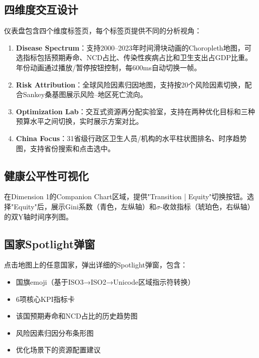 \documentclass[12pt,a4paper]{ctexart}
\begin{document}
\subsection{四维度交互设计}

仪表盘包含四个维度标签页，每个标签页提供不同的分析视角：

\begin{enumerate}[label=\textbf{D\arabic*.}]
    \item \textbf{Disease Spectrum}：支持2000--2023年时间滑块动画的Choropleth地图，可选指标包括预期寿命、NCD占比、传染性疾病占比和卫生支出占GDP比重。年份动画通过播放/暂停按钮控制，每600ms自动切换一帧。
    \item \textbf{Risk Attribution}：全球风险因素归因地图，支持按20个风险因素切换，配合Sankey桑基图展示风险--地区死亡流向。
    \item \textbf{Optimization Lab}：交互式资源再分配实验室，支持在两种优化目标和三种预算水平之间切换，实时展示方案对比。
    \item \textbf{China Focus}：31省级行政区卫生人员/机构的水平柱状图排名、时序趋势图，支持省份搜索和点击选中。
\end{enumerate}

\subsection{健康公平性可视化}

在Dimension 1的Companion Chart区域，提供"Transition | Equity"切换按钮。选择"Equity"后，展示Gini系数（青色，左纵轴）和$\sigma$-收敛指标（琥珀色，右纵轴）的双Y轴时间序列图。

\subsection{国家Spotlight弹窗}

点击地图上的任意国家，弹出详细的Spotlight弹窗，包含：
\begin{itemize}[leftmargin=1.5em]
    \item 国旗emoji（基于ISO3→ISO2→Unicode区域指示符转换）
    \item 6项核心KPI指标卡
    \item 该国预期寿命和NCD占比的历史趋势图
    \item 风险因素归因分布条形图
    \item 优化场景下的资源配置建议
\end{itemize}

\end{document}
